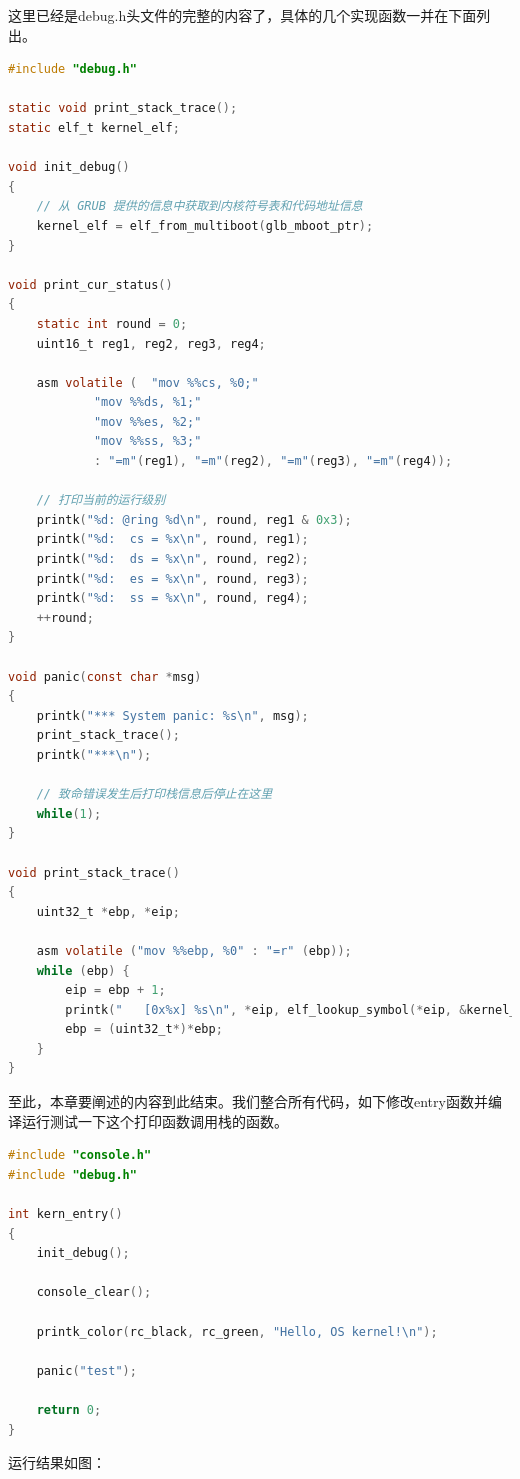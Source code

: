 \par 这里已经是debug.h头文件的完整的内容了，具体的几个实现函数一并在下面列出。

\begin{lstlisting}[language = C, caption = kernel/debug/debug.c]
#include "debug.h"

static void print_stack_trace();
static elf_t kernel_elf;

void init_debug()
{
	// 从 GRUB 提供的信息中获取到内核符号表和代码地址信息
	kernel_elf = elf_from_multiboot(glb_mboot_ptr);
}

void print_cur_status()
{
	static int round = 0;
	uint16_t reg1, reg2, reg3, reg4;

	asm volatile ( 	"mov %%cs, %0;"
			"mov %%ds, %1;"
			"mov %%es, %2;"
			"mov %%ss, %3;"
			: "=m"(reg1), "=m"(reg2), "=m"(reg3), "=m"(reg4));

	// 打印当前的运行级别
	printk("%d: @ring %d\n", round, reg1 & 0x3);
	printk("%d:  cs = %x\n", round, reg1);
	printk("%d:  ds = %x\n", round, reg2);
	printk("%d:  es = %x\n", round, reg3);
	printk("%d:  ss = %x\n", round, reg4);
	++round;
}

void panic(const char *msg)
{
	printk("*** System panic: %s\n", msg);
	print_stack_trace();
	printk("***\n");
	
	// 致命错误发生后打印栈信息后停止在这里
	while(1);
}

void print_stack_trace()
{
	uint32_t *ebp, *eip;

	asm volatile ("mov %%ebp, %0" : "=r" (ebp));
	while (ebp) {
		eip = ebp + 1;
		printk("   [0x%x] %s\n", *eip, elf_lookup_symbol(*eip, &kernel_elf));
		ebp = (uint32_t*)*ebp;
	}
}
\end{lstlisting}

\par 至此，本章要阐述的内容到此结束。我们整合所有代码，如下修改entry函数并编译运行测试一下这个打印函数调用栈的函数。

\begin{lstlisting}[language = C, caption = init/entry.c]
#include "console.h"
#include "debug.h"

int kern_entry()
{
	init_debug();

	console_clear();

	printk_color(rc_black, rc_green, "Hello, OS kernel!\n");

	panic("test");

	return 0;
}
\end{lstlisting}

\par 运行结果如图：

